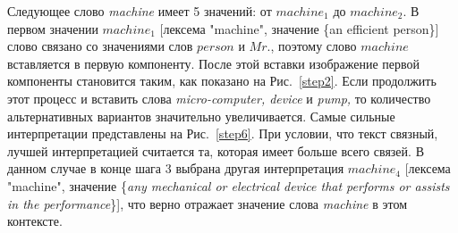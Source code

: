 \documentclass{article}
\begin{document}
\begin{articletext}
Следующее слово \textit{machine} имеет 5 значений: от $machine_1$  до $machine_2$. В первом значении $machine_1$  [лексема "machine", значение \{an efficient person\}] слово связано со значениями слов $person$ и $Mr.$, поэтому слово $machine$  вставляется в первую компоненту. После этой вставки изображение первой компоненты становится таким, как показано на Рис.~\ref{step2}. Если продолжить этот процесс и вставить слова \textit{micro-computer, device} и \textit{pump,} то количество альтернативных вариантов значительно увеличивается. Самые сильные интерпретации представлены на Рис.~\ref{step6}. При условии, что текст связный, лучшей интерпретацией считается та, которая имеет больше всего связей. В данном  случае в конце шага 3 выбрана другая интерпретация $machine_4$ [лексема "machine", значение \{\textit{any mechanical or electrical device that performs or assists in the performance}\}], что верно отражает значение слова \textit{machine} в этом контексте.



\end{articletext}
\end{document}
